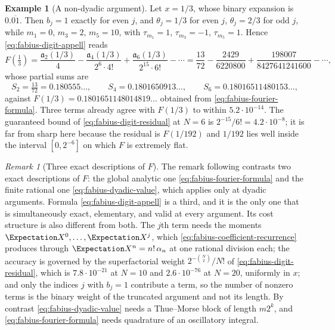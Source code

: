 \documentclass[11pt,a4paper,oneside,openany]{book}
\theoremstyle{definition}
\newtheorem{example}[example]{Example}
\theoremstyle{remark}
\newtheorem{remark}[remark]{Remark}
\begin{document}
\begin{example}[A non-dyadic argument]\label{ex:fabius-digit-onethird}
Let $x=1/3$, whose binary expansion is $0.\overline{01}$.  Then $b_j=1$ exactly for
even $j$, and $\theta_j=1/3$ for even $j$, $\theta_j=2/3$ for odd $j$, while
$m_1=0$, $m_3=2$, $m_5=10$, with $\tau_{m_1}=1$, $\tau_{m_3}=-1$,
$\tau_{m_5}=1$.  Hence \eqref{eq:fabius-digit-appell} reads
\[
 F\!\left(\tfrac13\right)
 =\frac{\mathfrak a_2(1/3)}{4}
 -\frac{\mathfrak a_4(1/3)}{2^{6}\cdot4!}
 +\frac{\mathfrak a_6(1/3)}{2^{15}\cdot6!}-\cdots
 =\frac{13}{72}-\frac{2429}{6220800}+\frac{198007}{8427641241600}-\cdots,
\]
whose partial sums are
\[
 S_2=\tfrac{13}{72}=0.180555\ldots,\qquad
 S_4=0.1801650913\ldots,\qquad
 S_6=0.18016511480153\ldots,
\]
against $F(1/3)=0.1801651148014819\ldots$ obtained from
\eqref{eq:fabius-fourier-formula}.  Three terms already agree with $F(1/3)$ to within
$5.2\cdot10^{-14}$.  The guaranteed bound of \eqref{eq:fabius-digit-residual} at $N=6$
is $2^{-15}/6!=4.2\cdot10^{-8}$; it is far from sharp here because the residual is
$F(1/192)$ and $1/192$ lies well inside the interval $[0,2^{-6}]$ on which $F$ is
extremely flat.
\end{example}

\begin{remark}[Three exact descriptions of $F$]\label{rem:fabius-third-description}
The remark following  contrasts two exact descriptions
of $F$: the global analytic one \eqref{eq:fabius-fourier-formula} and the finite
rational one \eqref{eq:fabius-dyadic-value}, which applies only at dyadic arguments.
Formula \eqref{eq:fabius-digit-appell} is a third, and it is the only one that is
simultaneously exact, elementary, and valid at every argument.  Its cost structure is
also different from both.  The $j$th term needs the moments
$\Expectation X^0,\ldots,\Expectation X^j$, which \eqref{eq:fabius-coefficient-recurrence}
produces through $\Expectation X^n=n!\,\alpha_n$ at one rational division each; the
accuracy is governed by the superfactorial
weight $2^{-\binom N2}/N!$ of \eqref{eq:fabius-digit-residual}, which is
$7.8\cdot10^{-21}$ at $N=10$ and $2.6\cdot10^{-76}$ at $N=20$, uniformly in $x$; and
only the indices $j$ with $b_j=1$ contribute a term, so the number of nonzero terms is
the binary weight of the truncated argument and not its length.  By contrast
\eqref{eq:fabius-dyadic-value} needs a Thue--Morse block of length $m2^k$, and
\eqref{eq:fabius-fourier-formula} needs quadrature of an oscillatory integral.
\end{remark}
\end{document}

